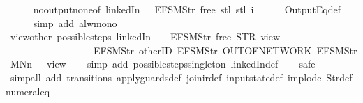 \begin{isabellebody}
\ \ \ \ \isamarkupfalse%
\ no{\isacharunderscore}output{\isacharunderscore}none{\isacharbrackleft}of\ linkedIn\ {\isachardoublequoteopen}{\isacharparenleft}{\isacharless}{\isachargreater}{\isacharparenleft}{}\ {\isacharcolon}{\isacharequal}\ EFSM{\isachardot}Str\ {\isacharprime}{\isacharprime}free{\isacharprime}{\isacharprime}{\isacharparenright}{\isacharparenright}{\isachardoublequoteclose}\ {\isachardoublequoteopen}stl\ {\isacharparenleft}stl\ i{\isacharparenright}{\isachardoublequoteclose}{\isacharbrackright}\isanewline
\ \ \ \ \isamarkupfalse%
\ OutputEq{\isacharunderscore}def\isanewline
\ \ \ \ \isamarkupfalse%
\ {\isacharparenleft}simp\ add{\isacharcolon}\ alw{\isacharunderscore}mono{\isacharparenright}\isanewline
\ \ \isamarkupfalse%
\isanewline
{}\isamarkupfalse%
%
\endisatagproof
{\isafoldproof}%
%
\isadelimproof
\isanewline
%
\endisadelimproof
\isanewline
{}\isamarkupfalse%
\ view{\isacharunderscore}other{\isacharcolon}\ {\isachardoublequoteopen}possible{\isacharunderscore}steps\ linkedIn\ {}\ {\isacharparenleft}{\isacharless}{\isachargreater}{\isacharparenleft}{}\ {\isacharcolon}{\isacharequal}\ EFSM{\isachardot}Str\ {\isacharprime}{\isacharprime}free{\isacharprime}{\isacharprime}{\isacharparenright}{\isacharparenright}\ STR\ {\isacharprime}{\isacharprime}view{\isacharprime}{\isacharprime}\isanewline
\ \ \ \ \ \ \ \ \ \ \ \ \ \ \ \ \ \ {\isacharbrackleft}EFSM{\isachardot}Str\ {\isacharprime}{\isacharprime}otherID{\isacharprime}{\isacharprime}{\isacharcomma}\ EFSM{\isachardot}Str\ {\isacharprime}{\isacharprime}OUT{\isacharunderscore}OF{\isacharunderscore}NETWORK{\isacharprime}{\isacharprime}{\isacharcomma}\ EFSM{\isachardot}Str\ {\isacharprime}{\isacharprime}MNn{}{\isacharprime}{\isacharprime}{\isacharbrackright}\ {\isacharequal}\ {\isacharbraceleft}{\isacharbar}{\isacharparenleft}{}{\isacharcomma}\ view{}{\isacharparenright}{\isacharbar}{\isacharbraceright}{\isachardoublequoteclose}\isanewline
%
\isadelimproof
\ \ %
\endisadelimproof
%
\isatagproof
{}\isamarkupfalse%
\ {\isacharparenleft}simp\ add{\isacharcolon}\ possible{\isacharunderscore}steps{\isacharunderscore}singleton\ linkedIn{\isacharunderscore}def{\isacharparenright}\isanewline
\ \ \isamarkupfalse%
\ safe\isanewline
\ \ \isamarkupfalse%
\ {\isacharparenleft}simp{\isacharunderscore}all\ add{\isacharcolon}\ transitions\ apply{\isacharunderscore}guards{\isacharunderscore}def\ join{\isacharunderscore}ir{\isacharunderscore}def\ input{}state{\isacharunderscore}def\ implode\ Str{\isacharunderscore}def\ numeral{\isacharunderscore}{}{\isacharunderscore}eq{\isacharunderscore}{}{\isacharparenright}%

\end{isabellebody}

